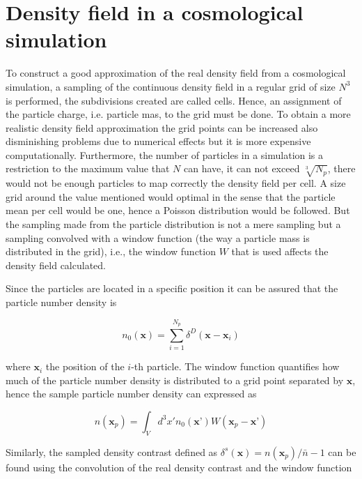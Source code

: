 \section{Density field in a cosmological simulation}

To construct a good approximation of the real density field from a cosmological simulation, 
a sampling of the continuous density field in a regular grid of size $N^3$ is 
performed, the subdivisions created are called cells. Hence, an assignment of the 
particle charge, i.e. particle mas, to the grid must be done. To obtain a more realistic 
density field approximation the grid points can be increased also disminishing problems 
due to numerical effects but it is more expensive computationally. Furthermore, the number 
of particles in a simulation is a restriction to the maximum value that $N$ can have, 
it can not exceed $\sqrt[3]{N_p}$, there would not be enough particles to map correctly 
the density field per cell. A size grid around the value mentioned would optimal in 
the sense that the particle mean per cell would be one, hence a Poisson distribution 
would be followed. But the sampling made from the particle distribution is not a 
mere sampling but a sampling convolved with a window function (the way a particle 
mass is distributed in the grid), i.e., the window function $W$ that is used affects 
the density field calculated. 

Since the particles are located in a specific position it can be assured that
the particle number density is 

\[n_0(\textbf{x}) = \sum_{i=1}^{N_{p}} \delta^D ( \textbf{x} - \textbf{x}_i )\]

where $\textbf{x}_i$ the position of the $i$-th particle. The window function 
quantifies how much of the particle number density is distributed to a grid point 
separated by $\textbf{x}$, hence the sample particle number density can expressed as 

\[n(\textbf{x}_p) = \int_V d^3 x' n_0(\textbf{x'}) W(\textbf{x}_p-\textbf{x'})\]

Similarly, the sampled density contrast defined as $\delta^s(\textbf{x})=n(\textbf{x}_p)/\bar{n}-1$ 
can be found using the convolution of the real density contrast and the window function 


